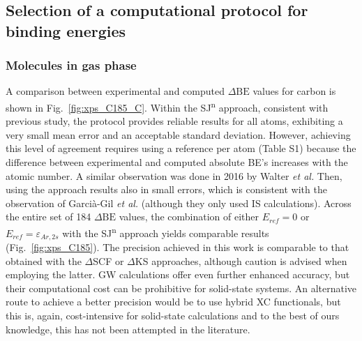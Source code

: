 \documentclass[journal=jpccck,manuscript=article]{achemso}
\def\dbe{\ensuremath{\Delta\text{BE}}}
\begin{document}

\subsection{Selection of a computational protocol for binding energies}\label{sec:proto}

\subsubsection{Molecules in gas phase}

A comparison between experimental and computed \dbe{} values for carbon is shown in Fig.~\ref{fig:xps_C185_C}. Within the SJ\textsuperscript{n} approach, consistent with previous study\cite{pueyobellafontPredictingCoreLevel2017}, the  protocol provides reliable results for all atoms, exhibiting a very small mean error and an acceptable standard deviation. However, achieving this level of agreement requires using a reference per atom (Table S1) because the difference between experimental and computed absolute BE's increases with the atomic number. A similar observation was done in 2016 by Walter \textit{et al.}\cite{walterOffsetcorrectedKohnShamScheme2016} 
Then, using the  approach results also in small errors, which is consistent with the observation of Garcià-Gil \textit{et al.}\cite{garcia-gilCalculationCoreLevel2012} (although they only used IS calculations). Across the entire set of 184 \dbe{} values, the combination of either $E_{ref}=0$ or $E_{ref}=\varepsilon_{Ar,2s}$ with the SJ\textsuperscript{n} approach yields comparable results (Fig.~\ref{fig:xps_C185}). 
The precision achieved in this work is comparable to that obtained with the  $\Delta$SCF\cite{golzeAccurateAbsoluteRelative2020,kleinNutsBoltsCorehole2021} or $\Delta$KS\cite{vandenbosscheEffectsNonlocalExchange2014,garcia-gilCalculationCoreLevel2012,walterOffsetcorrectedKohnShamScheme2016} approaches, although caution is advised when employing the latter\cite{pueyobellafontPredictionCoreLevel2015}. GW calculations offer even further enhanced accuracy\cite{golzeAccurateAbsoluteRelative2020}, but their computational cost can be prohibitive for solid-state systems\cite{leiGaussianbasedQuasiparticleSelfconsistent2022}. An alternative route to achieve a better precision would be to use hybrid XC functionals, but this is, again, cost-intensive for solid-state calculations and to the best of ours knowledge, this has not been attempted in the literature.
\end{document}
